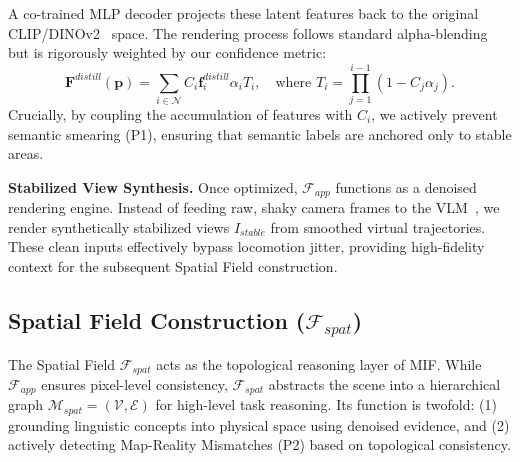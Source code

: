 \documentclass[conference]{IEEEtran}
\begin{document}
A co-trained MLP decoder projects these latent features back to the original CLIP/DINOv2~\cite{radford2021learning, oquab2024dinov2} space. The rendering process follows standard alpha-blending but is rigorously weighted by our confidence metric:
\begin{equation}
    \mathbf{F}^{distill}(\mathbf{p}) = \sum_{i \in \mathcal{N}} C_i \mathbf{f}_i^{distill} \alpha_i T_i, \quad \text{where } T_i = \prod_{j=1}^{i-1} (1 - C_j \alpha_j). \label{eq:rendering}
\end{equation}
Crucially, by coupling the accumulation of features with $C_i$, we actively prevent semantic smearing (P1), ensuring that semantic labels are anchored only to stable areas.

\vspace{1mm}
\noindent \textbf{Stabilized View Synthesis.} 
Once optimized, $\mathcal{F}_{app}$ functions as a denoised rendering engine. Instead of feeding raw, shaky camera frames to the VLM~\cite{chen2025sam, hurst2024gpt}, we render synthetically stabilized views $I_{stable}$ from smoothed virtual trajectories. These clean inputs effectively bypass locomotion jitter, providing high-fidelity context for the subsequent Spatial Field construction.

\subsection{Spatial Field Construction ($\mathcal{F}_{spat}$)}
\label{sec:spatial_field}

The Spatial Field $\mathcal{F}_{spat}$ acts as the topological reasoning layer of MIF. While $\mathcal{F}_{app}$ ensures pixel-level consistency, $\mathcal{F}_{spat}$ abstracts the scene into a hierarchical graph $\mathcal{M}_{spat} = (\mathcal{V}, \mathcal{E})$ for high-level task reasoning. Its function is twofold: (1) grounding linguistic concepts into physical space using denoised evidence, and (2) actively detecting Map-Reality Mismatches (P2) based on topological consistency.

\end{document}
